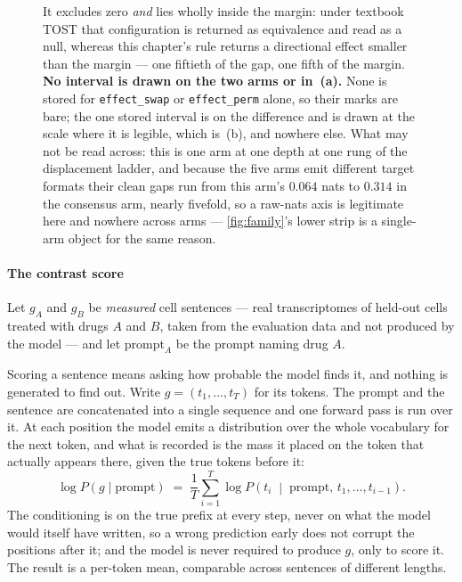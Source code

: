 \begin{figure}[htbp]
\begin{fullwidth}
{It excludes zero \emph{and} lies wholly inside the margin: under textbook TOST
that configuration is returned as equivalence and read as a null, whereas this
chapter's rule returns a directional effect smaller than the margin --- one
fiftieth of the gap, one fifth of the margin. \textbf{No interval is drawn on
the two arms or in~(a).} None is stored for \texttt{effect\_swap} or
\texttt{effect\_perm} alone, so their marks are bare; the one stored interval
is on the difference and is drawn at the scale where it is legible, which
is~(b), and nowhere else. What may not be read across: this is one arm at one
depth at one rung of the displacement ladder, and because the five arms emit
different target formats their clean gaps run from this arm's $0.064$ nats to
$0.314$ in the consensus arm, nearly fivefold, so a raw-nats axis is legitimate
here and nowhere across arms --- \cref{fig:family}'s lower strip is a
single-arm object for the same reason.}
\label{fig:materiality}
\end{fullwidth}
\end{figure}

\paragraph{The contrast score} Let $g_A$ and $g_B$ be \emph{measured} cell
sentences --- real transcriptomes of held-out cells treated with drugs $A$ and
$B$, taken from the evaluation data and not produced by the model --- and let
$\textrm{prompt}_A$ be the prompt naming drug $A$.

Scoring a sentence means asking how probable the model finds it, and nothing is
generated to find out. Write $g = (t_1, \ldots, t_T)$ for its tokens. The prompt
and the sentence are concatenated into a single sequence and one forward pass is
run over it. At each position the model emits a distribution over the whole
vocabulary for the next token, and what is recorded is the mass it placed on the
token that actually appears there, given the true tokens before it:
\begin{equation}
  \log P\!\left(g \mid \textrm{prompt}\right) \;=\;
  \frac{1}{T} \sum_{i=1}^{T}
  \log P\!\left(t_i \;\middle|\; \textrm{prompt},\, t_1, \ldots, t_{i-1}\right).
\end{equation}
The conditioning is on the true prefix at every step, never on what the model
would itself have written, so a wrong prediction early does not corrupt the
positions after it; and the model is never required to produce $g$, only to
score it. The result is a per-token mean, comparable across sentences of
different lengths.

